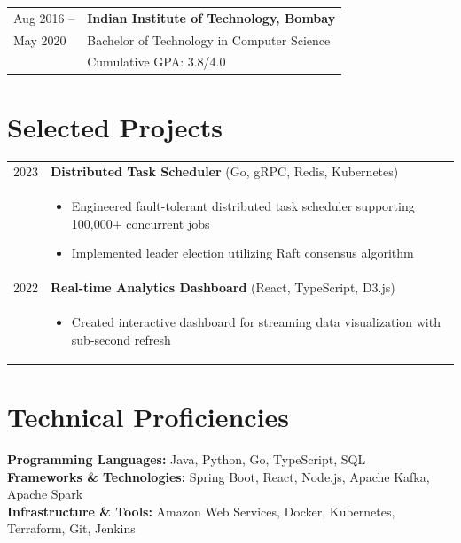 \documentclass[11pt,letterpaper]{article}
\begin{document}
\begin{tabular}{@{}p{1.2in}p{5.0in}@{}}
Aug 2016 -- & \textbf{Indian Institute of Technology, Bombay}\\
May 2020 & Bachelor of Technology in Computer Science\\
& Cumulative GPA: 3.8/4.0
\end{tabular}

\section{Selected Projects}

\begin{tabular}{@{}p{1.2in}p{5.0in}@{}}
2023 & \textbf{Distributed Task Scheduler} (Go, gRPC, Redis, Kubernetes)\\
& \begin{itemize}[leftmargin=*, itemsep=1pt, topsep=0pt, parsep=0pt]
    \item Engineered fault-tolerant distributed task scheduler supporting 100,000+ concurrent jobs
    \item Implemented leader election utilizing Raft consensus algorithm
  \end{itemize}\\[4pt]

2022 & \textbf{Real-time Analytics Dashboard} (React, TypeScript, D3.js)\\
& \begin{itemize}[leftmargin=*, itemsep=1pt, topsep=0pt, parsep=0pt]
    \item Created interactive dashboard for streaming data visualization with sub-second refresh
  \end{itemize}
\end{tabular}

\section{Technical Proficiencies}

\textbf{Programming Languages:} Java, Python, Go, TypeScript, SQL\\[2pt]
\textbf{Frameworks \& Technologies:} Spring Boot, React, Node.js, Apache Kafka, Apache Spark\\[2pt]
\textbf{Infrastructure \& Tools:} Amazon Web Services, Docker, Kubernetes, Terraform, Git, Jenkins
\end{document}
